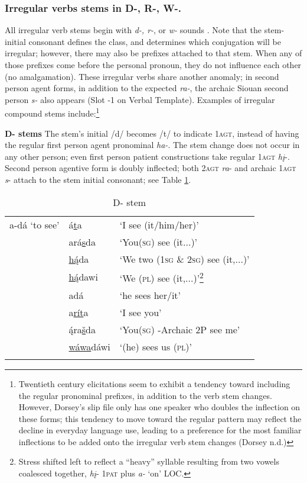 \documentclass[output=paper]{LSP/langsci}
\begin{document}
\subsubsection{Irregular verbs stems in D-, R-, W-.}  All irregular verb stems begin with  \textit{d-, r-}, or \textit{w-} sounds \citep[243]{Whitman1946}.  Note that the stem-initial consonant defines the class, and determines which conjugation will be irregular; however, there may also be prefixes attached to that stem. When any of those prefixes come before the personal pronoun, they do not influence each other (no amalgamation).  These irregular verbs share another anomaly; in second person agent forms, in addition to the expected \textit{ra-}, the archaic Siouan second person \textit{s-} also appears (Slot -1 on Verbal Template). Examples of irregular compound stems include:\footnote{Twentieth century elicitations seem to exhibit a tendency toward including the regular pronominal prefixes, in addition to the verb stem changes. However, Dorsey's slip file only has one speaker who doubles the inflection on these forms; this tendency to move toward the regular pattern may reflect the decline in everyday language use, leading to a preference for the most familiar inflections to be added onto the irregular verb stem changes (Dorsey n.d.)}	

\textbf{D- stems}  The stem's initial /d/ becomes /t/ to indicate \textsc{1agt}, instead of having the regular first person agent pronominal \textit{ha-}.  The stem change does not occur in any other person; even first person patient constructions take regular \textsc{1agt} \textit{h\k{i}}-. Second person agentive form is doubly inflected;  both \textsc{2agt} \textit{ra}- and archaic \textsc{1agt} \textit{s}- attach to the stem initial consonant; see Table \ref{dstem}. 				

\begin{table}
\caption{D- stem} \label{dstem}
\begin{tabular}{ l l l }
\lsptoprule
a-d\'a `to see' & \'a\underline{t}a & `I see (it/him/her)'	\\	
& ar\'a\underline{s}da 	& `You(\textsc{sg}) see (it...)'   \\	
& \underline{h\k{\'a}}da  & `We two (1\textsc{sg} \& 2\textsc{sg}) see (it,...)' \\
& \underline{h\k{\'a}}dawi & `We (\textsc{pl}) see (it,...)'\footnote{Stress shifted left to reflect a ``heavy'' syllable resulting from two vowels 
coalesced together, \textit{h\k{i}}- 1\textsc{pat} plus \textit{a-} `on' LOC.}  \\
&  ad\'a & `he sees her/it'\\
& a\underline{r\'i}\underline{t}a & `I see you'	\\				       
& \k{\'a}ra\underline{\v{s}}da & `You(\textsc{sg}) -Archaic 2P see me' \\
&  \underline{w\'awa}d\'awi	& `(he) sees us (\textsc{pl})' \\
\lspbottomrule \end{tabular}
\end{table}
\end{document}
